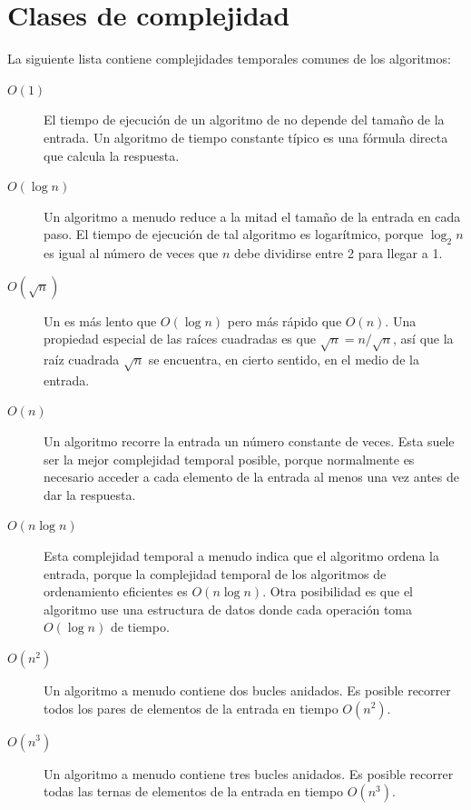 \section{Clases de complejidad}


La siguiente lista contiene complejidades temporales comunes
de los algoritmos:

\begin{description}
\item[$O(1)$]
El tiempo de ejecución de un algoritmo de 
no depende del tamaño de la entrada.
Un algoritmo de tiempo constante típico es una
fórmula directa que calcula la respuesta.

\item[$O(\log n)$]
Un algoritmo  a menudo reduce a la mitad
el tamaño de la entrada en cada paso.
El tiempo de ejecución de tal algoritmo
es logarítmico, porque
$\log_2 n$ es igual al número de veces
que $n$ debe dividirse entre 2 para llegar a 1.

\item[$O(\sqrt n)$]
Un  es más lento que
$O(\log n)$ pero más rápido que $O(n)$.
Una propiedad especial de las raíces cuadradas es que
$\sqrt n = n/\sqrt n$, así que la raíz cuadrada $\sqrt n$ se encuentra,
en cierto sentido, en el medio de la entrada.

\item[$O(n)$]
Un algoritmo  recorre la entrada
un número constante de veces.
Esta suele ser la mejor complejidad temporal posible,
porque normalmente es necesario acceder a cada
elemento de la entrada al menos una vez antes de
dar la respuesta.

\item[$O(n \log n)$]
Esta complejidad temporal a menudo indica que el
algoritmo ordena la entrada,
porque la complejidad temporal de los algoritmos
de ordenamiento eficientes es $O(n \log n)$.
Otra posibilidad es que el algoritmo
use una estructura de datos donde cada operación
toma $O(\log n)$ de tiempo.

\item[$O(n^2)$]
Un algoritmo  a menudo contiene
dos bucles anidados.
Es posible recorrer todos los pares de
elementos de la entrada en tiempo $O(n^2)$.

\item[$O(n^3)$]
Un algoritmo  a menudo contiene
tres bucles anidados.
Es posible recorrer todas las ternas de
elementos de la entrada en tiempo $O(n^3)$.


\end{description}
